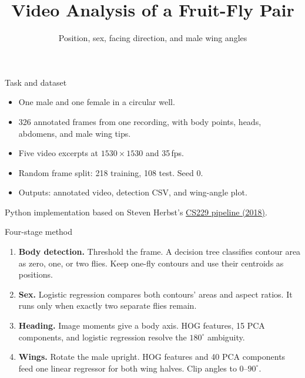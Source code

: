 \documentclass[aspectratio=169,11pt]{beamer}
\title{Video Analysis of a Fruit-Fly Pair}
\subtitle{Position, sex, facing direction, and male wing angles}
\author{}
\date{}
\begin{document}
\begin{frame}
\titlepage
\end{frame}

\begin{frame}{Task and dataset}
\begin{itemize}
\item One male and one female in a circular well.
\item 326 annotated frames from one recording, with body points, heads, abdomens, and male wing tips.
\item Five video excerpts at $1530\times1530$ and 35\,fps.
\item Random frame split: 218 training, 108 test. Seed 0.
\item Outputs: annotated video, detection CSV, and wing-angle plot.
\end{itemize}
\vspace{0.5em}
{\small Python implementation based on Steven Herbst's \href{https://cs229.stanford.edu/proj2018/report/61.pdf}{CS229 pipeline (2018)}.}
\end{frame}

\begin{frame}{Four-stage method}
\begin{enumerate}
\item \textbf{Body detection.} Threshold the frame. A decision tree classifies contour area as zero, one, or two flies. Keep one-fly contours and use their centroids as positions.
\item \textbf{Sex.} Logistic regression compares both contours' areas and aspect ratios. It runs only when exactly two separate flies remain.
\item \textbf{Heading.} Image moments give a body axis. HOG features, 15 PCA components, and logistic regression resolve the $180^\circ$ ambiguity.
\item \textbf{Wings.} Rotate the male upright. HOG features and 40 PCA components feed one linear regressor for both wing halves. Clip angles to $0$--$90^\circ$.
\end{enumerate}
\end{frame}
\end{document}
